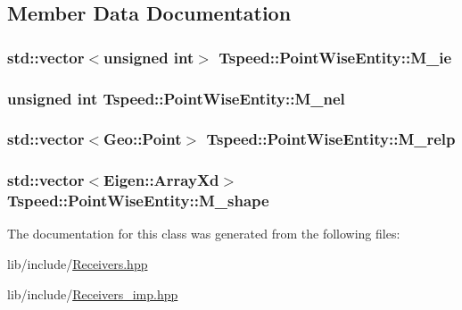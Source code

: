 \subsection{Member Data Documentation}
\hypertarget{classTspeed_1_1PointWiseEntity_a46a04f3b7eac6a6bbe78fffe227116d2}{
\subsubsection[{M\-\_\-ie}]{\setlength{\rightskip}{0pt plus 5cm}std\-::vector$<$unsigned int$>$ Tspeed\-::\-Point\-Wise\-Entity\-::\-M\-\_\-ie\hspace{0.3cm}{\ttfamily [protected]}}}\label{classTspeed_1_1PointWiseEntity_a46a04f3b7eac6a6bbe78fffe227116d2}
\hypertarget{classTspeed_1_1PointWiseEntity_a054e68f482b69877a7a4c4d2b03d6db3}{
\subsubsection[{M\-\_\-nel}]{\setlength{\rightskip}{0pt plus 5cm}unsigned int Tspeed\-::\-Point\-Wise\-Entity\-::\-M\-\_\-nel\hspace{0.3cm}{\ttfamily [protected]}}}\label{classTspeed_1_1PointWiseEntity_a054e68f482b69877a7a4c4d2b03d6db3}
\hypertarget{classTspeed_1_1PointWiseEntity_a7d32f8248f10ec3a0cf06bf41eeb5894}{
\subsubsection[{M\-\_\-relp}]{\setlength{\rightskip}{0pt plus 5cm}std\-::vector$<${\bf Geo\-::\-Point}$>$ Tspeed\-::\-Point\-Wise\-Entity\-::\-M\-\_\-relp\hspace{0.3cm}{\ttfamily [protected]}}}\label{classTspeed_1_1PointWiseEntity_a7d32f8248f10ec3a0cf06bf41eeb5894}
\hypertarget{classTspeed_1_1PointWiseEntity_a5be71b036f597e1a61909b1577ac2049}{
\subsubsection[{M\-\_\-shape}]{\setlength{\rightskip}{0pt plus 5cm}std\-::vector$<$Eigen\-::\-Array\-Xd$>$ Tspeed\-::\-Point\-Wise\-Entity\-::\-M\-\_\-shape\hspace{0.3cm}{\ttfamily [protected]}}}\label{classTspeed_1_1PointWiseEntity_a5be71b036f597e1a61909b1577ac2049}


The documentation for this class was generated from the following files\-:\begin{DoxyCompactItemize}
\item 
lib/include/\hyperlink{Receivers_8hpp}{Receivers.\-hpp}\item 
lib/include/\hyperlink{Receivers__imp_8hpp}{Receivers\-\_\-imp.\-hpp}\end{DoxyCompactItemize}
